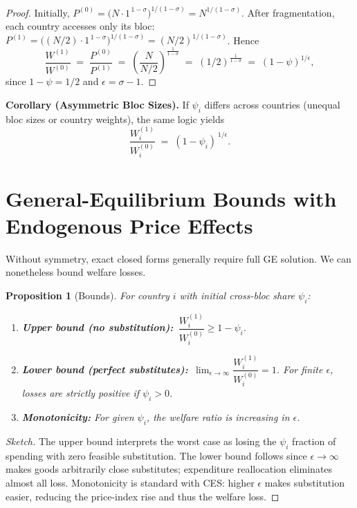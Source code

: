 \documentclass[11pt]{article}
\newtheorem{proposition}{Proposition}
\begin{document}
\begin{proof}
Initially, $P^{(0)} = \big(N\cdot 1^{\,1-\sigma}\big)^{1/(1-\sigma)} = N^{1/(1-\sigma)}$. After fragmentation, each country accesses only its bloc: $P^{(1)} = \big((N/2)\cdot 1^{\,1-\sigma}\big)^{1/(1-\sigma)} = (N/2)^{1/(1-\sigma)}$. Hence
\begin{equation}
\frac{W^{(1)}}{W^{(0)}} \;=\; \frac{P^{(0)}}{P^{(1)}} \;=\; \left(\frac{N}{N/2}\right)^{\frac{1}{1-\sigma}} \;=\; (1/2)^{\frac{1}{1-\sigma}} \;=\; (1-\psi)^{1/\epsilon},
\end{equation}
since $1-\psi = 1/2$ and $\epsilon=\sigma-1$.
\end{proof}

\noindent \textbf{Corollary (Asymmetric Bloc Sizes).}
If $\psi_i$ differs across countries (unequal bloc sizes or country weights), the same logic yields
\begin{equation}
\frac{W_i^{(1)}}{W_i^{(0)}} \;=\; (1-\psi_i)^{\,1/\epsilon}.
\end{equation}

\section{General-Equilibrium Bounds with Endogenous Price Effects}

Without symmetry, exact closed forms generally require full GE solution. We can nonetheless bound welfare losses.

\begin{proposition}[Bounds]\label{prop:bounds}
For country $i$ with initial cross-bloc share $\psi_i$:
\begin{enumerate}[label=(\alph*)]
\item \textbf{Upper bound (no substitution):} $\,\dfrac{W_i^{(1)}}{W_i^{(0)}} \ge 1-\psi_i$.
\item \textbf{Lower bound (perfect substitutes):} $\,\displaystyle \lim_{\epsilon\to\infty}\dfrac{W_i^{(1)}}{W_i^{(0)}} = 1$. For finite $\epsilon$, losses are strictly positive if $\psi_i>0$.
\item \textbf{Monotonicity:} For given $\psi_i$, the welfare ratio is increasing in $\epsilon$.
\end{enumerate}
\end{proposition}

\begin{proof}[Sketch]
The upper bound interprets the worst case as losing the $\psi_i$ fraction of spending with zero feasible substitution. The lower bound follows since $\epsilon\to\infty$ makes goods arbitrarily close substitutes; expenditure reallocation eliminates almost all loss. Monotonicity is standard with CES: higher $\epsilon$ makes substitution easier, reducing the price-index rise and thus the welfare loss.
\end{proof}
\end{document}
